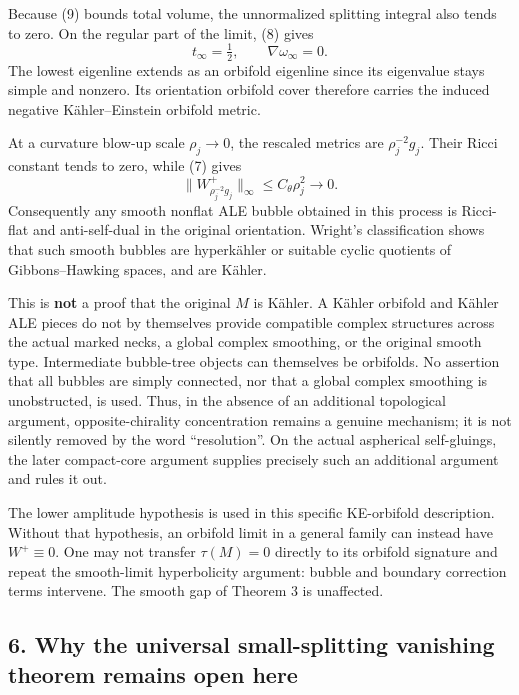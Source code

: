 \documentclass[
  11pt,
]{article}
\begin{document}
Because (9) bounds total volume, the unnormalized splitting integral
also tends to zero. On the regular part of the limit, (8) gives \[
 t_\infty=\tfrac12,\qquad \nabla\omega_\infty=0.
\] The lowest eigenline extends as an orbifold eigenline since its
eigenvalue stays simple and nonzero. Its orientation orbifold cover
therefore carries the induced negative Kähler--Einstein orbifold metric.

At a curvature blow-up scale \(\rho_j\to0\), the rescaled metrics are
\(\rho_j^{-2}g_j\). Their Ricci constant tends to zero, while (7) gives
\[
       \|W^+_{\rho_j^{-2}g_j}\|_\infty
                     \le C_\theta\rho_j^2\longrightarrow0.
\] Consequently any smooth nonflat ALE bubble obtained in this process
is Ricci-flat and anti-self-dual in the original orientation. Wright's
classification shows that such smooth bubbles are hyperkähler or
suitable cyclic quotients of Gibbons--Hawking spaces, and are Kähler.

This is \textbf{not} a proof that the original \(M\) is Kähler. A Kähler
orbifold and Kähler ALE pieces do not by themselves provide compatible
complex structures across the actual marked necks, a global complex
smoothing, or the original smooth type. Intermediate bubble-tree objects
can themselves be orbifolds. No assertion that all bubbles are simply
connected, nor that a global complex smoothing is unobstructed, is used.
Thus, in the absence of an additional topological argument,
opposite-chirality concentration remains a genuine mechanism; it is not
silently removed by the word ``resolution''. On the actual aspherical
self-gluings, the later compact-core argument supplies precisely such an
additional argument and rules it out.

The lower amplitude hypothesis is used in this specific KE-orbifold
description. Without that hypothesis, an orbifold limit in a general
family can instead have \(W^+\equiv0\). One may not transfer
\(\tau(M)=0\) directly to its orbifold signature and repeat the
smooth-limit hyperbolicity argument: bubble and boundary correction
terms intervene. The smooth gap of Theorem 3 is unaffected.

\hypertarget{why-the-universal-small-splitting-vanishing-theorem-remains-open-here}{%
\subsection{6. Why the universal small-splitting vanishing theorem
remains open
here}\label{why-the-universal-small-splitting-vanishing-theorem-remains-open-here}}
\end{document}
